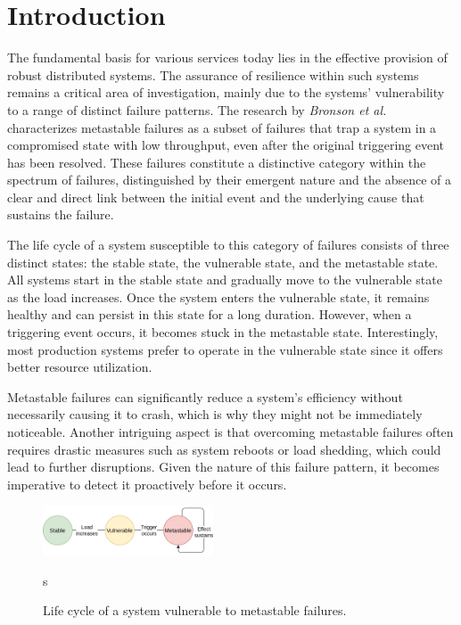\section{Introduction}
\label{sec:intro}



The fundamental basis for various services today lies in the effective provision of robust distributed systems. The assurance of resilience within such systems remains a critical area of investigation, mainly due to the systems' vulnerability to a range of distinct failure patterns.
The research by \textit{Bronson et al.}\cite{mtsb_hotos} characterizes metastable failures as a subset of failures that trap a system in a compromised state with low throughput, even after the original triggering event has been resolved. These failures constitute a distinctive category within the spectrum of failures, distinguished by their emergent nature and the absence of a clear and direct link between the initial event and the underlying cause that sustains the failure.

The life cycle of a system susceptible to this category of failures consists of three distinct states: the stable state, the vulnerable state, and the metastable state. All systems start in the stable state and gradually move to the vulnerable state as the load increases. Once the system enters the vulnerable state, it remains healthy and can persist in this state for a long duration. However, when a triggering event occurs, it becomes stuck in the metastable state. Interestingly, most production systems prefer to operate in the vulnerable state since it offers better resource utilization.

Metastable failures can significantly reduce a system's efficiency without necessarily causing it to crash, which is why they might not be immediately noticeable. Another intriguing aspect is that overcoming metastable failures often requires drastic measures such as system reboots or load shedding, which could lead to further disruptions. Given the nature of this failure pattern, it becomes imperative to detect it proactively before it occurs. 
\begin{figure}[h]
\includegraphics[width=0.45\textwidth]{images/mtsb.drawio.png}
\caption{Life cycle of a system vulnerable to metastable failures.}s
\end{figure}


